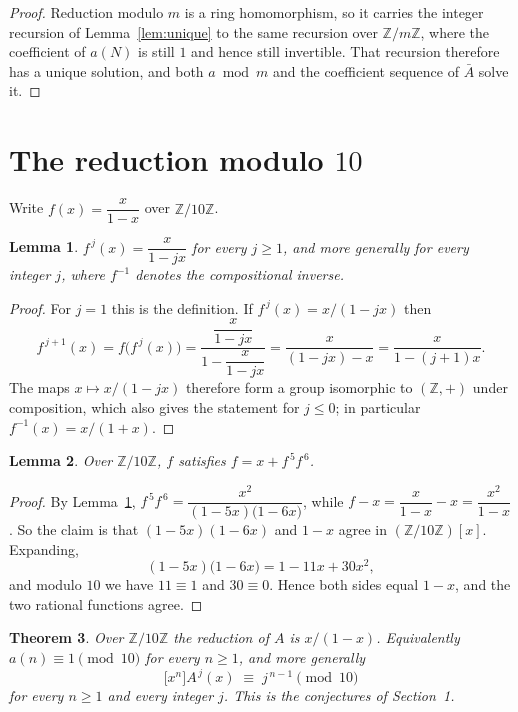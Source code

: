 \documentclass[11pt,a4paper]{article}
\theoremstyle{plain}
\newtheorem{theorem}{Theorem}
\newtheorem{lemma}[theorem]{Lemma}
\theoremstyle{definition}
\begin{document}
\begin{proof}
Reduction modulo $m$ is a ring homomorphism, so it carries the integer recursion of
Lemma~\ref{lem:unique} to the same recursion over $\mathbb{Z}/m\mathbb{Z}$, where the
coefficient of $a(N)$ is still $1$ and hence still invertible. That recursion therefore has
a unique solution, and both $a\bmod m$ and the coefficient sequence of $\bar A$ solve it.
\end{proof}

\section{The reduction modulo $10$}

Write $f(x)=\dfrac{x}{1-x}$ over $\mathbb{Z}/10\mathbb{Z}$.

\begin{lemma}\label{lem:iter}
$f^{\,j}(x)=\dfrac{x}{1-jx}$ for every $j\ge1$, and more generally for every integer
$j$, where $f^{-1}$ denotes the compositional inverse.
\end{lemma}

\begin{proof}
For $j=1$ this is the definition. If $f^{\,j}(x)=x/(1-jx)$ then
\[
f^{\,j+1}(x)=f\bigl(f^{\,j}(x)\bigr)
=\frac{\dfrac{x}{1-jx}}{1-\dfrac{x}{1-jx}}
=\frac{x}{(1-jx)-x}=\frac{x}{1-(j+1)x} .
\]
The maps $x\mapsto x/(1-jx)$ therefore form a group isomorphic to $(\mathbb{Z},+)$ under
composition, which also gives the statement for $j\le0$; in particular
$f^{-1}(x)=x/(1+x)$.
\end{proof}

\begin{lemma}\label{lem:sat}
Over $\mathbb{Z}/10\mathbb{Z}$, $f$ satisfies $f=x+f^{\,5}f^{\,6}$.
\end{lemma}

\begin{proof}
By Lemma~\ref{lem:iter}, $f^{\,5}f^{\,6}
=\dfrac{x^{2}}{(1-5x)\bigl(1-6x\bigr)}$, while
$f-x=\dfrac{x}{1-x}-x=\dfrac{x^{2}}{1-x}$. So the claim is that
$(1-5x)(1-6x)$ and $1-x$ agree in $(\mathbb{Z}/10\mathbb{Z})[x]$. Expanding,
\[
(1-5x)\bigl(1-6x\bigr)=1-11x+30x^{2} ,
\]
and modulo $10$ we have $11\equiv1$ and $30\equiv0$. Hence both sides equal
$1-x$, and the two rational functions agree.
\end{proof}


\begin{theorem}\label{thm:main}
Over $\mathbb{Z}/10\mathbb{Z}$ the reduction of $A$ is $x/(1-x)$. Equivalently
$a(n)\equiv1\pmod{10}$ for every $n\ge1$, and more generally
\[
\bigl[x^{n}\bigr]A^{\,j}(x)\;\equiv\;j^{\,n-1}\pmod{10}
\]
for every $n\ge1$ and every integer $j$. This is the conjectures of Section~1.
\end{theorem}
\end{document}
